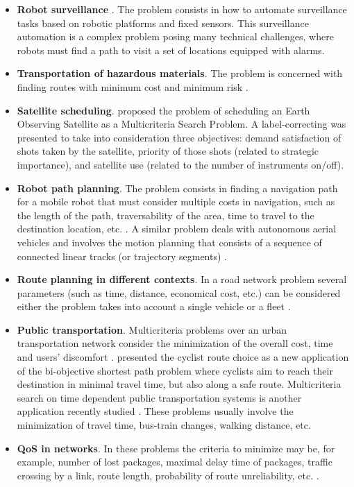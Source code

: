 \begin{itemize}
	\item \textbf{Robot surveillance} \citep{dellefaveetal2009}. The problem consists in how to automate surveillance tasks based on robotic platforms and fixed sensors. This surveillance automation is a complex problem posing many technical challenges, where robots must find a path to visit a set of locations equipped with alarms.
	\item \textbf{Transportation of hazardous materials}. The problem is concerned with finding routes with minimum cost and minimum risk \citep{Erkut2007,caramiaetal2010,Machucaetal2011}. 
	\item \textbf{Satellite scheduling}. \citet{Gabrel2002} proposed the problem of scheduling an Earth Observing Satellite as a Multicriteria Search Problem. A label-correcting was presented to take into consideration three objectives: demand satisfaction of shots taken by the satellite, priority of those shots (related to strategic importance), and satellite use (related to the number of instruments on/off). 
	\item \textbf{Robot path planning}. The problem consists in finding a navigation path for a mobile robot that must consider multiple costs in navigation, such as the length of the path, traversability of the area, time to travel to the destination location, etc. \citep{Fujimura1996}. A similar problem deals with autonomous aerial vehicles and involves the motion planning that consists of a sequence of connected linear tracks (or trajectory segments) \citep{Wu2011}.
	\item \textbf{Route planning in different contexts}. In a road network problem several parameters (such as time, distance, economical cost, etc.) can be considered either the problem takes into account a single vehicle or a fleet \citep{Jozefowiez2008,Delling2009,Machuca2012}.
	\item \textbf{Public transportation}. Multicriteria problems over an urban transportation network consider the minimization of the overall cost, time and users' discomfort \citep{Modesti1998}. \citet{Raith2009} presented the cyclist route choice as a new application of the bi-objective shortest path problem where cyclists aim to reach their destination in minimal travel time, but also along a safe route. Multicriteria search on time dependent public transportation systems is another application recently studied \citep{Wu2004,Muller-Hannemann2004,Pyrga2008,Disser2008}. These problems usually involve the minimization of travel time, bus-train changes, walking distance, etc. 
	\item \textbf{QoS in networks}. In these problems the criteria to minimize may be, for example, number of lost packages, maximal delay time of packages, traffic crossing by a link, route length, probability of route unreliability, etc. \citep{climacoetal2003, craveirinha2009}.
\end{itemize}

